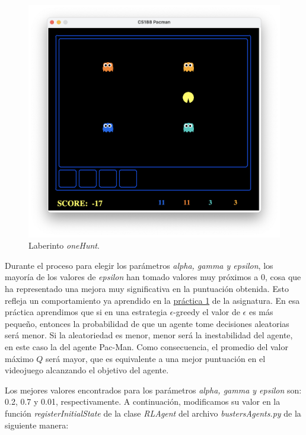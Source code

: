 \documentclass[11pt]{exam}
\begin{document}
\begin{figure}[H]
	\centering
	\includegraphics[scale=0.4]{score}
	\vspace*{-7mm}
	\caption{Laberinto \textit{oneHunt}.}
	\label{average_score}
\end{figure}

Durante el proceso para elegir los parámetros \textit{alpha, gamma y epsilon}, los mayoría de los valores de \textit{epsilon} han tomado valores muy próximos a 0, cosa que ha representado una mejora muy significativa en la puntuación obtenida. Esto refleja un comportamiento ya aprendido en la \href{https://poliformat.upv.es/portal/site/ESP_0_2835/tool/c07b745a-0cfd-44f0-a7a2-9bb22f80c3f7?panel=Main}{práctica 1} de la asignatura. En esa práctica aprendimos que si en una estrategia $\epsilon$-greedy el valor de $\epsilon$ es más pequeño, entonces la probabilidad de que un agente tome decisiones aleatorias será menor. Si la aleatoriedad es menor, menor será la inestabilidad del agente, en este caso la del agente Pac-Man. Como consecuencia, el promedio del valor máximo $Q$ será mayor, que es equivalente a una mejor puntuación en el videojuego alcanzando el objetivo del agente. 
\vspace*{2mm}

Los mejores valores encontrados para los parámetros \textit{alpha, gamma y epsilon} son: 0.2, 0.7 y 0.01, respectivamente. A continuación, modificamos su valor en la función \textit{registerInitialState} de la clase \textit{RLAgent} del archivo \textit{bustersAgents.py} de la siguiente manera:
\vspace*{2mm}
\end{document}
